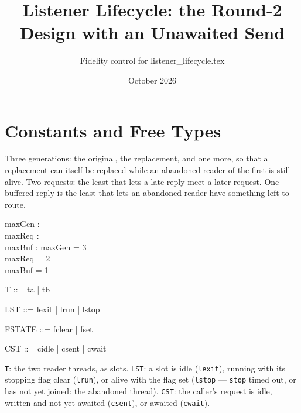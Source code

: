 \documentclass[a4paper,10pt,fleqn]{article}
\begin{document}
\title{Listener Lifecycle: the Round-2 Design with an Unawaited Send}
\author{Fidelity control for listener\_lifecycle.tex}
\date{October 2026}
\maketitle

\section{Constants and Free Types}

Three generations: the original, the replacement, and one more, so that a
replacement can itself be replaced while an abandoned reader of the first is
still alive.  Two requests: the least that lets a late reply meet a later
request.  One buffered reply is the least that lets an abandoned reader have
something left to route.

\begin{axdef}
  maxGen : \nat \\
  maxReq : \nat \\
  maxBuf : \nat
\where
  maxGen = 3 \\
  maxReq = 2 \\
  maxBuf = 1
\end{axdef}

\begin{zed}
  T ::= ta | tb
\end{zed}

\begin{zed}
  LST ::= lexit | lrun | lstop
\end{zed}

\begin{zed}
  FSTATE ::= fclear | fset
\end{zed}

\begin{zed}
  CST ::= cidle | csent | cwait
\end{zed}

\texttt{T}: the two reader threads, as slots.  \texttt{LST}: a slot is idle
(\texttt{lexit}), running with its stopping flag clear (\texttt{lrun}), or
alive with the flag set (\texttt{lstop} --- \texttt{stop} timed out, or has
not yet joined: the abandoned thread).  \texttt{CST}: the caller's request is
idle, written and not yet awaited (\texttt{csent}), or awaited
(\texttt{cwait}).
\end{document}
